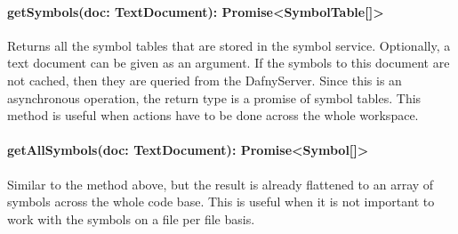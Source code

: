 \paragraph{getSymbols(doc: TextDocument): Promise<SymbolTable[]>} Returns all the symbol tables that are stored in the symbol service. Optionally, a text document can be given as an argument. If the symbols to this document are not cached, then they are queried from the DafnyServer. Since this is an asynchronous operation, the return type is a promise of symbol tables. This method is useful when actions have to be done across the whole workspace.

\paragraph{getAllSymbols(doc: TextDocument): Promise<Symbol[]>} Similar to the method above, but the result is already flattened to an array of symbols across the whole code base. This is useful when it is not important to work with the symbols on a file per file basis.

